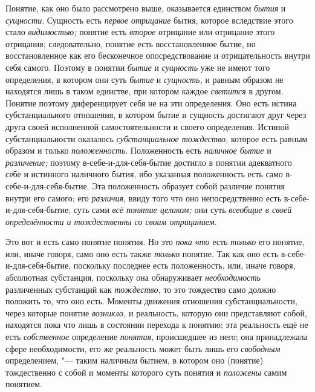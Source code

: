 Понятие, как оно было рассмотрено выше, оказывается единством {\em бытия} и
{\em сущности}. Сущность есть {\em первое отрицание} бытия, которое вследствие
этого стало {\em видимостью;} понятие есть {\em второе}
отрицание или отрицание этого отрицания; следовательно,
понятие есть восстановленное бытие, но восстановленное как его бесконечное
опосредствование и отрицательность внутри себя самого. Поэтому в понятии
{\em бытие} и {\em сущность} уже не имеют того определения, в котором они суть
{\em бытие} и {\em сущность,} и равным образом не находятся лишь в таком
единстве, при котором каждое {\em светится} в другом.
Понятие поэтому диференцирует себя не на эти определения. Оно есть истина
субстанциального отношения, в котором бытие и сущность достигают друг через
друга своей исполненной самостоятельности и своего определения. Истиной
субстанциальности оказалось {\em субстанциальное тождество,}
которое есть равным образом и только {\em положенность}.
Положенность есть {\em наличное бытие} и {\em различение;} поэтому
в-себе-и-для-себя-бытие достигло в понятии адекватного себе и истинного
наличного бытия, ибо указанная положенность есть само
в-себе-и-для-себя-бытие. Эта положенность образует собой различие понятия
внутри его самого; его {\em различия,} ввиду того что
оно
непосредственно есть в-себе-и-для-себя-бытие, суть сами
{\em всё понятие целиком;} они суть {\em всеобщие в
своей определённости и тождественны со своим отрицанием}.

Это вот и есть само понятие понятия. Но это {\em пока что} есть
{\em только} его понятие, или, иначе говоря, само оно есть также
{\em только} понятие. Так
как оно есть в-себе-и-для-себя-бытие, поскольку последнее есть
положенность, или, иначе говоря, абсолютная субстанция, поскольку она
обнаруживает {\em необходимость} различенных субстанций как
{\em тождество,} то это
тождество само должно положить то, что оно есть. Моменты движения отношения
субстанциальности, через которые понятие {\em возникло,} и
реальность, которую они представляют собой, находятся пока что лишь в
состоянии перехода к понятию; эта реальность ещё не есть
{\em собственное} определение {\em понятия,}
происшедшее из него; она принадлежала сфере необходимости,
его же реальность может быть лишь его {\em свободным}
определением, "--- таким наличным бытием, в
котором оно (понятие) тождественно с собой и моменты которого суть понятия
и {\em положены} самим понятием.


